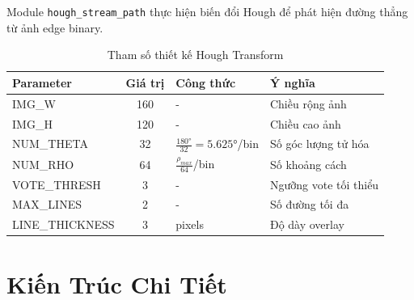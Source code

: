 \documentclass[12pt,a4paper]{report}
\begin{document}
Module \texttt{hough\_stream\_path} thực hiện biến đổi Hough để phát hiện đường thẳng từ ảnh edge binary.

\begin{table}[H]
\centering
\caption{Tham số thiết kế Hough Transform}
\label{tab:hough_params}
\begin{tabular}{|l|c|l|l|}
\hline
\textbf{Parameter} & \textbf{Giá trị} & \textbf{Công thức} & \textbf{Ý nghĩa} \\
\hline
IMG\_W & 160 & - & Chiều rộng ảnh \\
IMG\_H & 120 & - & Chiều cao ảnh \\
NUM\_THETA & 32 & $\frac{180°}{32} = 5.625°$/bin & Số góc lượng tử hóa \\
NUM\_RHO & 64 & $\frac{\rho_{max}}{64}$/bin & Số khoảng cách \\
VOTE\_THRESH & 3 & - & Ngưỡng vote tối thiểu \\
MAX\_LINES & 2 & - & Số đường tối đa \\
LINE\_THICKNESS & 3 & pixels & Độ dày overlay \\
\hline
\end{tabular}
\end{table}

\section{Kiến Trúc Chi Tiết}
\end{document}
